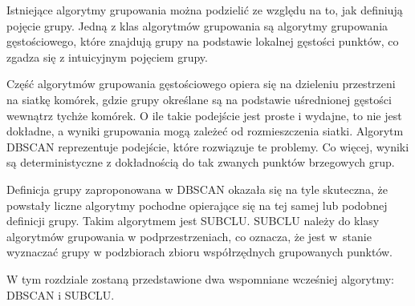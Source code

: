 Istniejące algorytmy grupowania można podzielić ze względu na to, jak definiują pojęcie grupy. Jedną z klas algorytmów grupowania są algorytmy grupowania gęstościowego, które znajdują grupy na podstawie lokalnej gęstości punktów, co zgadza się z intuicyjnym pojęciem grupy.\par

Część algorytmów grupowania gęstościowego opiera się na dzieleniu przestrzeni na siatkę komórek, gdzie grupy określane są na podstawie uśrednionej gęstości wewnątrz tychże komórek. O ile takie podejście jest proste i wydajne, to nie jest dokładne, a wyniki grupowania mogą zależeć od rozmieszczenia siatki. Algorytm DBSCAN reprezentuje podejście, które rozwiązuje te problemy. Co więcej, wyniki są deterministyczne z dokładnością do tak zwanych punktów brzegowych grup.\par
Definicja grupy zaproponowana w DBSCAN okazała się na tyle skuteczna, że powstały liczne algorytmy pochodne opierające się na tej samej lub podobnej definicji grupy. Takim algorytmem jest SUBCLU. SUBCLU należy do klasy algorytmów grupowania w podprzestrzeniach, co oznacza, że jest \mbox{w stanie} wyznaczać grupy w podzbiorach zbioru współrzędnych grupowanych punktów.\par
W tym rozdziale zostaną przedstawione dwa wspomniane wcześniej algorytmy: DBSCAN i SUBCLU.